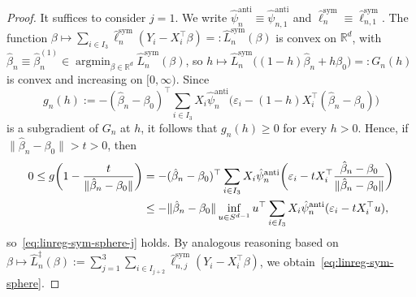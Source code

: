 \documentclass[a4paper]{article}
\newcommand{\R}{\mathbb{R}}
\newcommand{\norm}[1]{\|{#1}\|}
\DeclareMathOperator*{\argmin}{argmin}
\theoremstyle{definition}
\begin{document}
\begin{proof}
It suffices to consider $j = 1$. We write $\hat{\psi}_n^{\mathrm{anti}} \equiv \hat{\psi}_{n,1}^{\mathrm{anti}}$ and $\hat{\ell}_n^{\mathrm{sym}} \equiv \hat{\ell}_{n,1}^{\mathrm{sym}}$. The function $\beta \mapsto \sum_{i \in I_3} \hat{\ell}_n^{\mathrm{sym}}(Y_i - X_i^\top\beta) =: \hat{L}_n^{\mathrm{sym}}(\beta)$ is convex on $\R^d$, with $\hat{\beta}_n \equiv \hat{\beta}_n^{(1)} \in \argmin_{\beta \in \R^d}\hat{L}_n^{\mathrm{sym}}(\beta)$, so $h \mapsto \hat{L}_n^{\mathrm{sym}}\bigl((1 - h)\hat{\beta}_n + h\beta_0\bigr) =: G_n(h)$ is convex and increasing on $[0,\infty)$. Since
\[
g_n(h) := -(\hat{\beta}_n - \beta_0)^\top\sum_{i \in I_3} X_i\hat{\psi}_n^{\mathrm{anti}}\bigl(\varepsilon_i - (1-h)X_i^\top(\hat{\beta}_n - \beta_0)\bigr)
\]
is a subgradient of $G_n$ at $h$, it follows that $g_n(h) \geq 0$ for every $h > 0$. Hence, if $\norm{\hat{\beta}_n - \beta_0} > t > 0$, then 
\begin{align}
0 \leq g\biggl(1 - \frac{t}{\norm{\hat{\beta}_n - \beta_0}}\biggr) &= -(\hat{\beta}_n - \beta_0)^\top\sum_{i \in I_3} X_i\hat{\psi}_n^{\mathrm{anti}}\biggl(\varepsilon_i - tX_i^\top\frac{\hat{\beta}_n - \beta_0}{\norm{\hat{\beta}_n - \beta_0}}\biggr) \notag \\
\label{eq:linreg-sym-sphere-j-1}
&\leq -\norm{\hat{\beta}_n - \beta_0}\inf_{u \in S^{d-1}} u^\top\sum_{i \in I_3}X_i\hat{\psi}_n^{\mathrm{anti}}(\varepsilon_i - tX_i^\top u),
\end{align}
so~\eqref{eq:linreg-sym-sphere-j} holds. By analogous reasoning based on $\beta \mapsto \hat{L}_n^\ddagger(\beta) := \sum_{j=1}^3 \sum_{i \in I_{j+2}} \hat{\ell}_{n,j}^{\mathrm{sym}}(Y_i - X_i^\top\beta)$, we obtain~\eqref{eq:linreg-sym-sphere}.


\end{proof}
\end{document}
